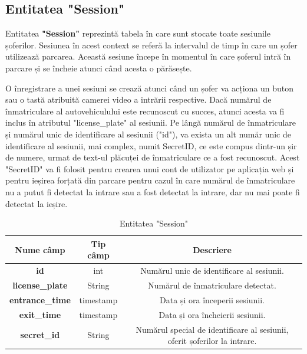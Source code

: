 \documentclass[12pt]{article}
\begin{document}
\subsection{Entitatea "Session"}

Entitatea \textbf{"Session"} reprezint\u{a} tabela \^{i}n care sunt stocate toate sesiunile șoferilor. Sesiunea \^{i}n acest context se refer\u{a} la intervalul de timp \^{i}n care un șofer utilizeaz\u{a} parcarea. Aceast\u{a} sesiune \^{i}ncepe \^{i}n momentul \^{i}n care șoferul intr\u{a} \^{i}n parcare și se \^{i}ncheie atunci c\^{a}nd acesta o p\u{a}r\u{a}sește.

O \^{i}nregistrare a unei sesiuni se creaz\u{a} atunci c\^{a}nd un șofer va acționa un buton sau o tast\u{a} atribuit\u{a} camerei video a intr\u{a}rii respective. Dac\u{a} num\u{a}rul de \^{i}nmatriculare al autovehiculului este recunoscut cu succes, atunci acesta va fi inclus \^{i}n atributul "license\_plate" al sesiunii. Pe l\^{a}ng\u{a} num\u{a}rul de \^{i}nmatriculare și num\u{a}rul unic de identificare al sesiunii ("id"), va exista un alt num\u{a}r unic de identificare al sesiunii, mai complex, numit SecretID, ce este compus dintr-un șir de numere, urmat de text-ul pl\u{a}cuței de \^{i}nmatriculare ce a fost recunoscut. Acest "SecretID" va fi folosit pentru crearea unui cont de utilizator pe aplicația web și pentru ieșirea forțat\u{a} din parcare pentru cazul \^{i}n care num\u{a}rul de \^{i}nmatriculare nu a putut fi detectat la intrare sau a fost detectat la intrare, dar nu mai poate fi detectat la ieșire.

\begin{table}[h]
\centering
\begin{tabular}{|c|c|c|}
\hline
\textbf{Nume c\^{a}mp}  & \textbf{Tip c\^{a}mp} & \textbf{Descriere} \\
\hline
\textbf{id} & int & Num\u{a}rul unic de identificare al sesiunii.  \\
\hline
\textbf{license\_plate} & String & Num\u{a}rul de \^{i}nmatriculare detectat.  \\
\hline
\textbf{entrance\_time} & timestamp & Data și ora \^{i}nceperii sesiunii.  \\
\hline
\textbf{exit\_time} & timestamp & Data și ora \^{i}ncheierii sesiunii.  \\
\hline
\textbf{secret\_id} & String & Num\u{a}rul special de identificare al sesiunii, oferit șoferilor la intrare.  \\
\hline
\end{tabular}
\caption{Entitatea "Session"}
\end{table}
\end{document}

